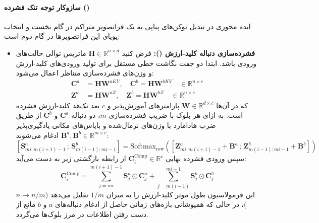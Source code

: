 \paragraph*{سازوکار توجه تنک فشرده ()}
ایده محوری در  تبدیل توکن‌های پیاپی به یک فراتصویر متراکم در گام نخست و انتخاب پویای این فراتصویرها در گام دوم است:
\begin{itemize}
    \item \textbf{فشرده‌سازی دنباله کلید-ارزش ():} فرض کنید $\mathbf{H} \in \mathbb{R}^{n \times d}$ ماتریس توالی حالت‌های ورودی باشد. ابتدا دو جفت نگاشت خطی مستقل برای تولید ورودی‌های کلید-ارزش و وزن‌های فشرده‌سازی متناظر اعمال می‌شود:
    \begin{align}
        \mathbf{C}^a &= \mathbf{H}\mathbf{W}^{aKV}, \quad \mathbf{C}^b = \mathbf{H}\mathbf{W}^{bKV} \quad \in \mathbb{R}^{n \times c} \\
        \mathbf{Z}^a &= \mathbf{H}\mathbf{W}^{aZ}, \quad \mathbf{Z}^b = \mathbf{H}\mathbf{W}^{bZ} \quad \in \mathbb{R}^{n \times c}
    \end{align}
    که در آن‌ها $\mathbf{W} \in \mathbb{R}^{d \times c}$ پارامترهای آموزش‌پذیر و $c$ بعد تک‌هد کلید-ارزش فشرده است. به ازای هر بلوک با ضریب فشرده‌سازی $m$، دو دنباله $\mathbf{C}^a$ و $\mathbf{C}^b$ از طریق ضرب هادامارد با وزن‌های نرمال‌شده و بایاس‌های مکانی یادگیری‌پذیر $\mathbf{B}^a, \mathbf{B}^b \in \mathbb{R}^{m \times c}$ ادغام می‌شوند:
    \begin{equation}
        \left[ \mathbf{S}^a_{mi : m(i+1)-1} \,;\, \mathbf{S}^b_{m(i-1) : mi-1} \right] = \text{Softmax}_{\text{row}}\left( \left[ \mathbf{Z}^a_{mi : m(i+1)-1} + \mathbf{B}^a \,;\, \mathbf{Z}^b_{m(i-1) : mi-1} + \mathbf{B}^b \right] \right)
    \end{equation}
    سپس ورودی فشرده نهایی $\mathbf{C}^{\text{Comp}}_i \in \mathbb{R}^{c}$ از رابطه بازگشتی زیر به دست می‌آید:
    \begin{equation}
        \mathbf{C}^{\text{Comp}}_i = \sum_{j=mi}^{m(i+1)-1} \mathbf{S}_j^a \odot \mathbf{C}_j^a + \sum_{j=m(i-1)}^{mi-1} \mathbf{S}_j^b \odot \mathbf{C}_j^b
    \end{equation}
    این فرمولاسیون طول موثر کلید-ارزش را به میزان $1/m$ تقلیل می‌دهد ($n \to n/m$)، در حالی که همپوشانی بازه‌های زمانی حاصل از ادغام دنباله‌های $a$ و $b$ مانع از دست رفتن اطلاعات در مرز بلوک‌ها می‌گردد.
    

\end{itemize}
